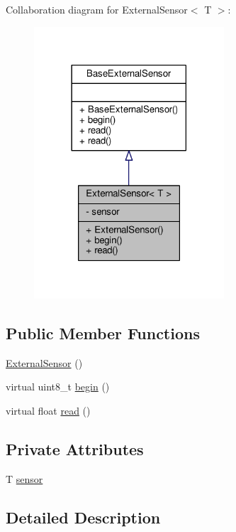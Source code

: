 Collaboration diagram for External\+Sensor$<$ T $>$\+:\nopagebreak
\begin{figure}[H]
\begin{center}
\leavevmode
\includegraphics[width=201pt]{d7/d2f/class_external_sensor__coll__graph}
\end{center}
\end{figure}
\subsection*{Public Member Functions}
\begin{DoxyCompactItemize}
\item 
\hyperlink{class_external_sensor_a8b991447fba33253103d06198b838751}{External\+Sensor} ()
\item 
virtual uint8\+\_\+t \hyperlink{class_external_sensor_ab6fe1379d55b656a048e0fba1e0a32e6}{begin} ()
\item 
virtual float \hyperlink{class_external_sensor_a5fb3afc7d244fb86dac68ab5481bc407}{read} ()
\end{DoxyCompactItemize}
\subsection*{Private Attributes}
\begin{DoxyCompactItemize}
\item 
T \hyperlink{class_external_sensor_a6e1f518119abe08c14b498ce24a7e1b3}{sensor}
\end{DoxyCompactItemize}


\subsection{Detailed Description}
